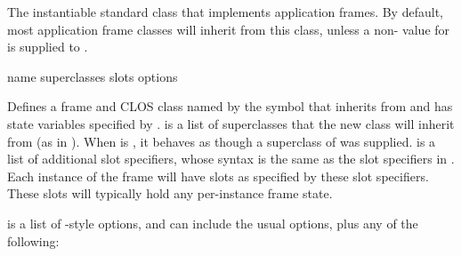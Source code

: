 
The instantiable standard class that implements application frames.  By default,
most application frame classes will inherit from this class, unless a
non- value for  is supplied to .


 {name superclasses slots \rest options}

Defines a frame and CLOS class named by the symbol  that inherits from
 and has state variables specified by .
 is a list of superclasses that the new class will inherit
from (as in ).  When  is , it behaves as
though a superclass of  was supplied.
 is a list of additional slot specifiers, whose syntax is the same as
the slot specifiers in .  Each instance of the frame will have
slots as specified by these slot specifiers.  These slots will typically hold
any per-instance frame state.

 is a list of -style options, and can include the
usual  options, plus any of the following:

